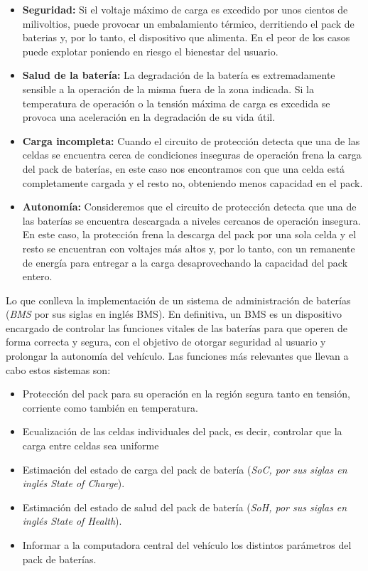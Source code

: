 \documentclass[10pt,a4paper]{article}
\begin{document}
	\begin{itemize}
		\item \textbf{Seguridad:} Si el voltaje máximo de carga es excedido por 
        unos cientos de milivoltios, puede provocar un embalamiento térmico, 
        derritiendo el pack de baterias y, por lo tanto, el dispositivo que 
        alimenta. En el peor de los casos puede explotar poniendo en riesgo el 
        bienestar del usuario.
		\item \textbf{Salud de la batería:} La degradación de la batería es 
        extremadamente sensible a la operación de la misma fuera de la zona 
        indicada. Si la temperatura de operación o la tensión máxima de carga 
        es excedida se provoca una aceleración en la degradación de su vida 
        útil.
		\item \textbf{Carga incompleta:} Cuando el circuito de protección 
        detecta que una de las celdas se encuentra cerca de condiciones 
        inseguras de operación frena la carga del pack de baterías, en este 
        caso nos encontramos con que una celda está completamente cargada y el 
        resto no, obteniendo menos capacidad en el pack.
		\item \textbf{Autonomía:} Consideremos que el circuito de protección 
        detecta que una de las baterías se encuentra descargada a niveles 
        cercanos de operación insegura. En este caso, la protección frena la 
        descarga del pack por una sola celda y el resto se encuentran con 
        voltajes más altos y, por lo tanto, con un remanente de energía para 
        entregar a la carga desaprovechando la capacidad del pack entero.
	\end{itemize}
    
    \noindent Lo que conlleva la implementación de un sistema de administración 
    de baterías (\emph{\acrshort{BMS}} por sus siglas en inglés \acrlong{BMS}). En definitiva, un \acrshort{BMS} es un dispositivo encargado de controlar las 
    funciones vitales de las baterías para que operen de forma correcta y segura, 
    con el objetivo de otorgar seguridad al usuario y prolongar la autonomía del 
    vehículo. Las funciones más relevantes que llevan a cabo estos sistemas son:
	
	\begin{itemize}
		\item Protección del pack para su operación en la región segura tanto 
            en tensión, corriente como también en temperatura.
		\item Ecualización de las celdas individuales del pack, es decir,
            controlar que la carga entre celdas sea uniforme
		\item Estimación del estado de carga del pack de batería 
            (\emph{SoC, por sus siglas en inglés State of Charge}).
		\item Estimación del estado de salud del pack de batería 
            (\emph{SoH, por sus siglas en inglés State of Health}).
		\item Informar a la computadora central del vehículo los distintos 
            parámetros del pack de baterías.
	\end{itemize}
\end{document}
